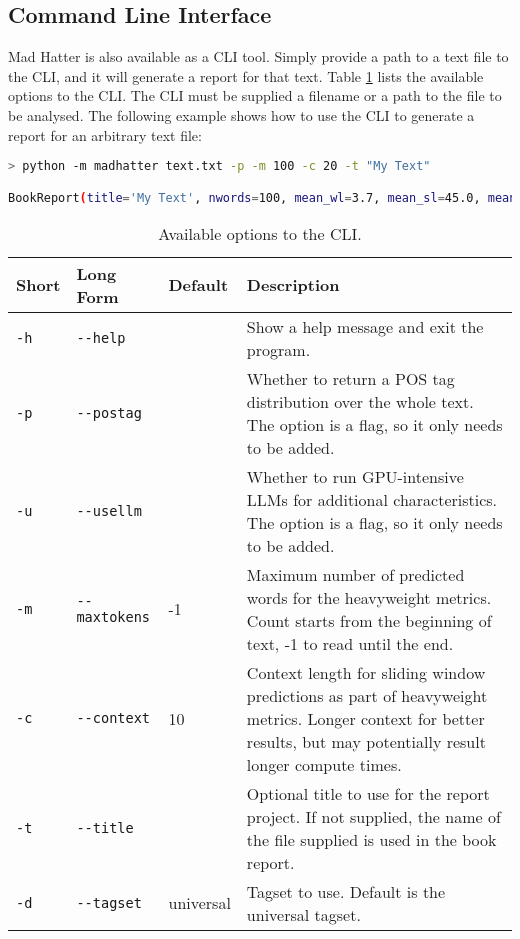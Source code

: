 \subsection{Command Line Interface}
Mad Hatter is also available as a CLI tool. Simply provide a path to a text file to the CLI, and it will generate a report for that text. Table \ref{tab:cli_options} lists the available options to the CLI. The CLI must be supplied a filename or a path to the file to be analysed. 
The following example shows how to use the CLI to generate a report for an arbitrary text file:

\begin{lstlisting}[language=bash, breaklines]
> python -m madhatter text.txt -p -m 100 -c 20 -t "My Text"

BookReport(title='My Text', nwords=100, mean_wl=3.7, mean_sl=45.0, mean_tokenspersent=10.0, prop_contentwords=0.1, mean_conc=4.0633333333333335, mean_img=5.359999999999999, mean_freq=-1.6792249660842167, prop_pos={'ADJ': 0.2, 'NOUN': 0.3, 'VERB': 0.1}, surprisal=None, predictability=None)
\end{lstlisting}

\begin{table}[h!]
    \centering
    \begin{tabular}{lllp{}}
        \toprule
        Short & Long Form & Default & Description \\
        \midrule
        \texttt{-h} & \verb|--help| & & Show a help message and exit the program.\\
        \texttt{-p} & \verb|--postag| & & Whether to return a POS tag distribution over the whole text. The option is a flag, so it only needs to be added. \\
        \texttt{-u} & \verb|--usellm| & & Whether to run GPU-intensive LLMs for additional characteristics. The option is a flag, so it only needs to be added. \\
        \texttt{-m} & \verb|--maxtokens| & -1 & Maximum number of predicted words for the heavyweight metrics. Count starts from the beginning of text, -1 to read until the end. \\
        \texttt{-c} & \verb|--context| & 10 & Context length for sliding window predictions as part of heavyweight metrics. Longer context for better results, but may potentially result longer compute times.\\
        \texttt{-t} & \verb|--title| & 
         & Optional title to use for the report project. If not supplied, the name of the file supplied is used in the book report.\\
        \texttt{-d} & \verb|--tagset| & universal & Tagset to use. Default is the universal tagset.\\
        \bottomrule
      
    \end{tabular}
    \caption{Available options to the CLI.}\label{tab:cli_options}
\end{table}


